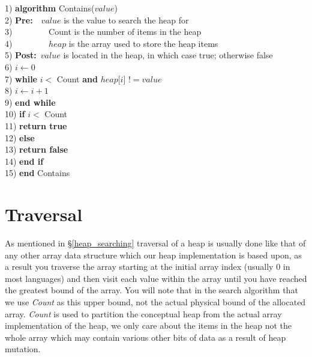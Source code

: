 \newpage
\begin{tabbing}
1)  \textbf{alg}\= \textbf{orithm} Contains($value$) \\
2)  \> \textbf{Pre:}~~$value$ is the value to search the heap for \\
3)  \> ~~~~~~~~Count is the number of items in the heap \\
4)  \> ~~~~~~~~$heap$ is the array used to store the heap items \\
5)  \> \textbf{Post:}~$value$ is located in the heap, in which case true; otherwise false \\
6)  \> $i \leftarrow 0$ \\
7)  \> \textbf{whi}\= \textbf{le} $i <$ Count \textbf{and} $heap$[$i$] $!= value$ \\
8)  \> \> $i \leftarrow i + 1$ \\
9)  \> \textbf{end while} \\
10) \> \textbf{if} $i <$ Count \\
11) \> \> \textbf{return true} \\
12) \> \textbf{else} \\
13) \> \> \textbf{return false} \\
14) \> \textbf{end if} \\
15) \textbf{end} Contains \\
\end{tabbing}

\section{Traversal}
As mentioned in \S\ref{heap_searching} traversal of a heap is usually done like that of any other array data structure which our heap implementation is based upon, as a result you traverse the array starting at the initial array index (usually $0$ in most languages) and then visit each value within the array until you have reached the greatest bound of the array. You will note that in the search algorithm that we use \textit{Count} as this upper bound, not the actual physical bound of the allocated array. \textit{Count} is used to partition the conceptual heap from the actual array implementation of the heap, we only care about the items in the heap not the whole array which may contain various other bits of data as a result of heap mutation.
